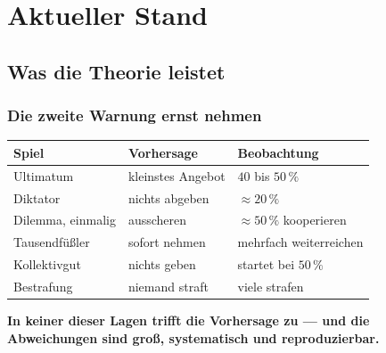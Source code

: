 \part{Aktueller Stand}

\chapter{Was die Theorie leistet}

\section{Die zweite Warnung ernst nehmen}

\begin{merksatz}
\begin{center}
{\small
\renewcommand{\arraystretch}{1.55}
\begin{tabular}{@{}P{2.8cm}P{2.6cm}P{2.6cm}@{}}
\toprule
\textbf{Spiel} & \textbf{Vorhersage} & \textbf{Beobachtung}\\
\midrule
Ultimatum & kleinstes Angebot & $40$ bis $50\,\%$\\
Diktator & nichts abgeben & $\approx 20\,\%$\\
Dilemma, einmalig & ausscheren & $\approx 50\,\%$ kooperieren\\
Tausendfüßler & sofort nehmen & mehrfach weiterreichen\\
Kollektivgut & nichts geben & startet bei $50\,\%$\\
Bestrafung & niemand straft & viele strafen\\
\bottomrule
\end{tabular}}
\end{center}

\begin{center}
\begin{minipage}{0.9\textwidth}
\textbf{In keiner dieser Lagen trifft die Vorhersage zu --- und die Abweichungen sind groß, systematisch und reproduzierbar.}
\end{minipage}
\end{center}

\begin{center}
\begin{minipage}{0.88\textwidth}
\end{minipage}
\end{center}
\end{merksatz}

